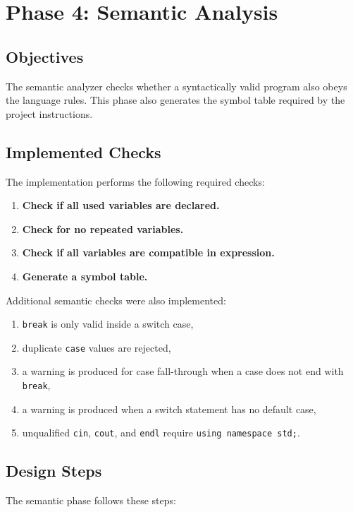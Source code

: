 \documentclass[12pt,a4paper]{article}
\begin{document}
\section{Phase 4: Semantic Analysis}
\subsection{Objectives}
The semantic analyzer checks whether a syntactically valid program also obeys the language rules. This phase also generates the symbol table required by the project instructions.

\subsection{Implemented Checks}
The implementation performs the following required checks:

\begin{enumerate}
    \item \textbf{Check if all used variables are declared.}
    \item \textbf{Check for no repeated variables.}
    \item \textbf{Check if all variables are compatible in expression.}
    \item \textbf{Generate a symbol table.}
\end{enumerate}

Additional semantic checks were also implemented:

\begin{enumerate}
    \item \texttt{break} is only valid inside a switch case,
    \item duplicate \texttt{case} values are rejected,
    \item a warning is produced for case fall-through when a case does not end with \texttt{break},
    \item a warning is produced when a switch statement has no default case,
    \item unqualified \texttt{cin}, \texttt{cout}, and \texttt{endl} require \texttt{using namespace std;}.
\end{enumerate}

\subsection{Design Steps}
The semantic phase follows these steps:
\end{document}
